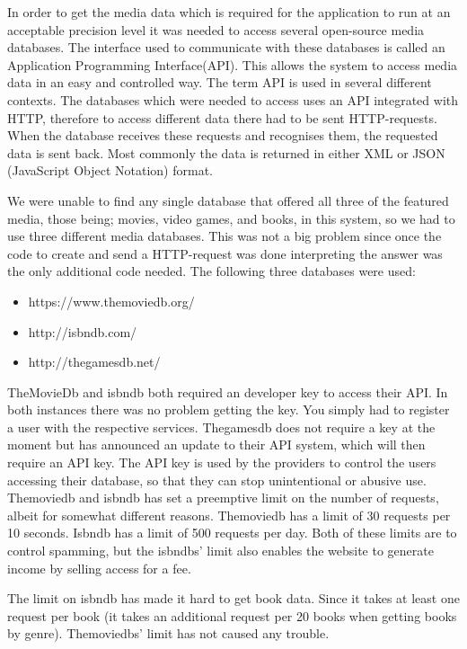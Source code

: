 In order to get the media data which is required for the application to run at an acceptable precision level it was needed to access several open-source media databases. The interface used to communicate with these databases is called an Application Programming Interface(API). This allows the system to access media data in an easy and controlled way. The term API is used in several different contexts\cite{apiWiki}. The databases which were  needed to access uses an API integrated with HTTP, therefore to access different data there had to be sent HTTP-requests. When the database receives these requests and recognises them, the requested data is sent back. Most commonly the data is returned in either XML or JSON (JavaScript Object Notation) format.

We were unable to find any single database that offered all three of the featured media, those being; movies, video games, and books, in this system, so we had to use three different media databases. This was not a big problem since once the code to create and send a HTTP-request was done interpreting the answer was the only additional code needed.  The following three databases were used:

\begin{itemize}
	\item https://www.themoviedb.org/
	\item http://isbndb.com/
	\item http://thegamesdb.net/
\end{itemize}

TheMovieDb and isbndb both required an developer key to access their API. In both instances there was no problem getting the key. You simply had to register a user with the respective services. %
Thegamesdb does not require a key at the moment but has announced an update to their API system, which will then require an API key.
The API key is used by the providers to control the users accessing their database, so that  they can stop unintentional or abusive use. Themoviedb and isbndb has set a preemptive limit on the number of requests, albeit for somewhat different reasons. Themoviedb has a limit of 30 requests per 10 seconds\cite{themoviedbApi}. Isbndb has a limit of 500 requests per day. Both of these limits are to control spamming, but the isbndbs' limit also enables the website to generate income by selling access for a fee.

The limit on isbndb has made it hard to get book data. Since it takes at least one request per book (it takes an additional request per 20 books when getting books by genre). Themoviedbs’ limit has not caused any trouble.

